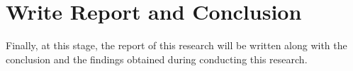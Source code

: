 \section{Write Report and Conclusion}
Finally, at this stage, the report of this research will be written along with the conclusion and the findings obtained during conducting this research.